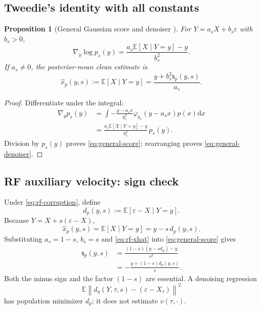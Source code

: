 \documentclass[11pt,a4paper]{article}
\newcommand{\E}{\mathbb{E}}
\newcommand{\norm}[1]{\left\lVert #1 \right\rVert}
\newcommand{\dd}{\mathrm{d}}
\newcommand{\score}{\mathsf{s}}
\newcommand{\xhat}{\widehat{x}}
\theoremstyle{plain}
\newtheorem{proposition}[theorem]{Proposition}
\theoremstyle{definition}
\begin{document}
\subsection{Tweedie's identity with all constants}

\begin{proposition}[General Gaussian score and denoiser {\cite{tweedie}}]
\label{prop:tweedie}
For $Y=a_sX+b_s\varepsilon$ with $b_s>0$,
\begin{equation}
\boxed{
\nabla_y\log p_s(y)
=\frac{a_s\E[X\mid Y=y]-y}{b_s^2}
}.
\label{eq:general-score}
\end{equation}
If $a_s\ne0$, the posterior-mean clean estimate is
\begin{equation}
\boxed{
\xhat_p(y,s):=\E[X\mid Y=y]
=\frac{y+b_s^2\score_p(y,s)}{a_s}
}.
\label{eq:general-denoiser}
\end{equation}
\end{proposition}

\begin{proof}
Differentiate under the integral:
\begin{align*}
\nabla_y p_s(y)
&=\int-\frac{y-a_sx}{b_s^2}
  \varphi_{b_s}(y-a_sx)p(x)\dd x\\
&=\frac{a_s\E[X\mid Y=y]-y}{b_s^2}\,p_s(y).
\end{align*}
Division by $p_s(y)$ proves \eqref{eq:general-score}; rearranging proves
\eqref{eq:general-denoiser}.
\end{proof}

\subsection{RF auxiliary velocity: sign check}

Under \eqref{eq:rf-corruption}, define
\begin{equation}
d_p(y,s):=\E[\varepsilon-X\mid Y=y].
\label{eq:rf-d}
\end{equation}
Because $Y=X+s(\varepsilon-X)$,
\begin{equation}
\boxed{\xhat_p(y,s)=\E[X\mid Y=y]=y-s\,d_p(y,s)}.
\label{eq:rf-xhat}
\end{equation}
Substituting $a_s=1-s$, $b_s=s$ and \eqref{eq:rf-xhat} into
\eqref{eq:general-score} gives
\begin{align}
\score_p(y,s)
&=\frac{(1-s)(y-sd_p)-y}{s^2}\nonumber\\
&=\boxed{-\frac{y+(1-s)d_p(y,s)}{s}}.
\label{eq:rf-score}
\end{align}
Both the minus sign and the factor $(1-s)$ are essential.  A denoising regression
\[
\E\norm{d_\eta(Y,\tau,s)-(\varepsilon-X_\tau)}^2
\]
has population minimizer $d_p$; it does not estimate $v(\tau,\cdot)$.
\end{document}
